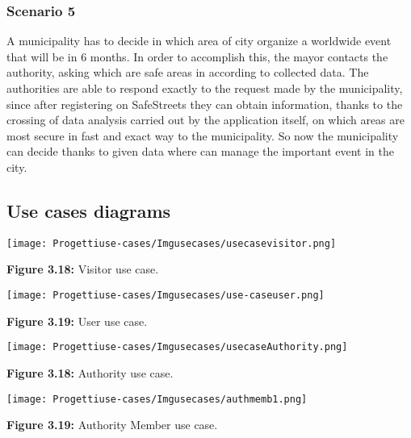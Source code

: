 \documentclass[12pt]{article}
\begin{document}
\subsubsection{Scenario 5}
\vspace{2mm}
A municipality has to decide in which area of city organize a worldwide event that will be in 6 months. In order to accomplish this, the mayor contacts the authority, asking which are safe areas in according to collected data. The authorities are able to respond exactly to the request made by the municipality, since after registering on SafeStreets they can obtain information, thanks to the crossing of data analysis carried out by the application itself, on which areas are most secure in fast and exact way to the municipality. So now the municipality can decide thanks to given data where can manage the important event in the city.

\newpage

\subsection{Use cases diagrams}

\vspace{5mm}
\begin{center}
\texttt{[image: Progettiuse-cases/Imgusecases/usecasevisitor.png]}                 

\textbf{Figure 3.18:} Visitor use case. 
\end{center}

\begin{center}
\texttt{[image: Progettiuse-cases/Imgusecases/use-caseuser.png]}                 

\textbf{Figure 3.19:} User use case. 
\end{center}

\newpage
\vspace{5mm}
\begin{center}
\texttt{[image: Progettiuse-cases/Imgusecases/usecaseAuthority.png]}                 

\textbf{Figure 3.18:} Authority use case. 
\end{center}

\begin{center}
\texttt{[image: Progettiuse-cases/Imgusecases/authmemb1.png]}                 

\textbf{Figure 3.19:} Authority Member use case. 
\end{center}
\end{document}
